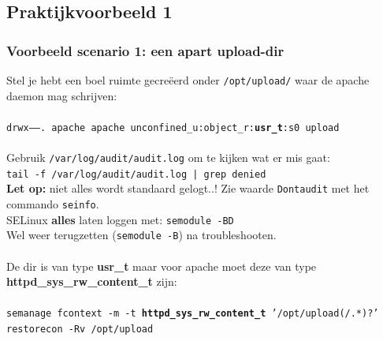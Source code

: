 %

\subsection{Praktijkvoorbeeld 1}
\begin{styleframe}
    \frametitle{Voorbeeld scenario 1: een apart upload-dir}
Stel je hebt een boel ruimte gecre{\"e}erd onder {\tt /opt/upload/} waar de apache daemon mag schrijven: \\
~\\
\tiny
{\tt drwx------. apache apache unconfined\_u:object\_r:{\bf usr\_t}:s0 upload} \\
\pause
~\\
\small
Gebruik {\tt /var/log/audit/audit.log} om te kijken wat er mis gaat: \\
{\tt tail -f /var/log/audit/audit.log | grep denied} \\
{\bf Let op:} niet alles wordt standaard gelogt..! Zie waarde {\tt Dontaudit} met het commando {\tt seinfo}. \\
SELinux {\bf alles} laten loggen met: {\tt semodule -BD} \\
Wel weer terugzetten ({\tt semodule -B}) na troubleshooten. \\
\pause
~\\
De dir is van type {\bf usr\_t} maar voor apache moet deze van type {\bf httpd\_sys\_rw\_content\_t} zijn: \\
~\\
\tiny
{\tt semanage fcontext -m -t {\bf httpd\_sys\_rw\_content\_t} '/opt/upload(/.*)?'} \\
{\tt restorecon -Rv /opt/upload}
\end{styleframe}


